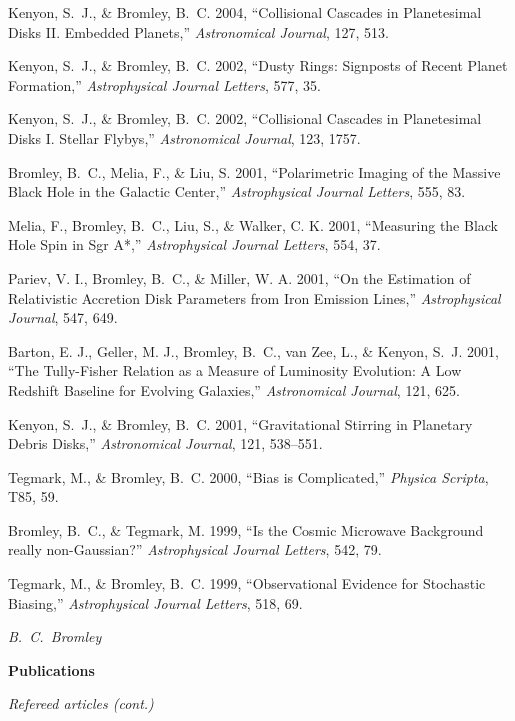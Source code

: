 \documentclass[11pt]{article}
\def\refitem{} %
\def\defsty{\setlength{\parskip}{11pt}
\setlength{\oddsidemargin}{0.0in}
\setlength{\evensidemargin}{0.0in}
\setlength{\parindent}{0in}}
\def\bibsty{\setlength{\parskip}{0pt}
\setlength{\oddsidemargin}{0.33in}
\setlength{\evensidemargin}{0.33in}
\setlength{\parindent}{-0.33in}}
\newcommand{\shead}[1]{\vspace{12.5pt}\centerline{{\bf{#1}}}}
\begin{document}
\refitem Kenyon, S.~J., \& Bromley, B.~C. 2004, ``Collisional Cascades
in Planetesimal Disks II. Embedded Planets,'' {\em Astronomical
  Journal}, 127, 513.

\refitem Kenyon, S.~J., \& Bromley, B.~C. 2002, ``Dusty Rings:
Signposts of Recent Planet Formation,'' {\em Astrophysical Journal
  Letters}, 577, 35.

\refitem Kenyon, S.~J., \& Bromley, B.~C. 2002, ``Collisional Cascades
in Planetesimal Disks I. Stellar Flybys,'' {\em Astronomical Journal},
123, 1757.


\refitem Bromley, B.~C., Melia, F., \& Liu, S. 2001, ``Polarimetric
Imaging of the Massive Black Hole in the Galactic Center,'' {\em
  Astrophysical Journal Letters}, 555, 83.

\refitem Melia, F., Bromley, B.~C., Liu, S., \& Walker, C. K. 2001,
``Measuring the Black Hole Spin in Sgr A*,'' {\em Astrophysical
  Journal Letters}, 554, 37.

\refitem Pariev, V. I., Bromley, B.~C., \& Miller, W. A.  2001, ``On
the Estimation of Relativistic Accretion Disk Parameters from Iron
Emission Lines,'' {\em Astrophysical Journal}, 547, 649.


\refitem Barton, E. J., Geller, M. J., Bromley, B.~C., van Zee, L., \&
Kenyon, S.~J.  2001, ``The Tully-Fisher Relation as a Measure of
Luminosity Evolution: A Low Redshift Baseline for Evolving Galaxies,''
{\em Astronomical Journal}, 121, 625.

\refitem Kenyon, S.~J., \& Bromley, B.~C. 2001, ``Gravitational
Stirring in Planetary Debris Disks,'' {\em Astronomical Journal}, 121,
538--551.

\refitem Tegmark, M., \& Bromley, B.~C. 2000, ``Bias is Complicated,''
         {\em Physica Scripta}, T85, 59.

\refitem Bromley, B.~C., \& Tegmark, M. 1999, ``Is the Cosmic
Microwave Background really non-Gaussian?'' {\em Astrophysical Journal
  Letters}, 542, 79.


\refitem Tegmark, M., \& Bromley, B.~C. 1999, ``Observational Evidence
for Stochastic Biasing,'' {\em Astrophysical Journal Letters}, 518,
69.


\newpage
\defsty
\mbox{} \hfill {\it B.\ C.\ Bromley}
\vspace{-11pt}
\shead{Publications}
\centerline{\em Refereed articles (cont.)}
\vspace{-5.5pt}
\bibsty
\end{document}
